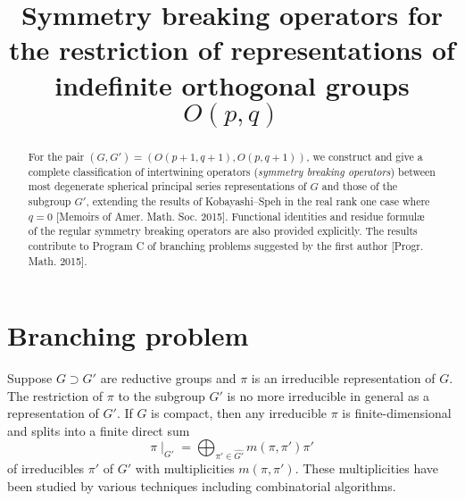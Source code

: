 \documentclass[reqno,12pt]{pja00} %
\theoremstyle{definition}
\theoremstyle{exampstyle} \newtheorem{examp}[theorem]{Theorem}
\begin{document}
\title{Symmetry breaking operators for the restriction of representations of indefinite orthogonal groups $O(p,q)$}

  \maketitle
\begin{abstract}
	For the pair $(G, G') =(O(p+1, q+1), O(p,q+1))$, we construct and give a complete classification of intertwining operators (\textit{symmetry breaking operators})
	between
most degenerate spherical
principal series representations of 
$G$ and those of the subgroup $G'$, extending the results of Kobayashi--Speh in the real rank one case where $q=0$
 [Memoirs of Amer. Math. Soc. 2015].
Functional identities and residue formul\ae\, of the regular symmetry breaking operators are also provided 
explicitly.
The results contribute to Program C of branching problems suggested by the first author [Progr. Math. 2015].
\end{abstract}

\section{Branching problem}

Suppose $G \supset G'$ are reductive groups and $\pi$ is an irreducible
representation of $G$. 
The restriction of $\pi$ to the subgroup $G'$ is no more irreducible in general as a representation
of $G'$. If $G$ is compact, then any irreducible $\pi$ is finite-dimensional and splits
into a finite direct sum
\[ \pi\!\mid_{G'} = \bigoplus_{\pi' \in \widehat{G'}} m (\pi, \pi') \pi' \]
of irreducibles $\pi'$ of $G'$ with multiplicities $m(\pi,\pi')$. These multiplicities have been studied
by various techniques including combinatorial algorithms.
\end{document}
